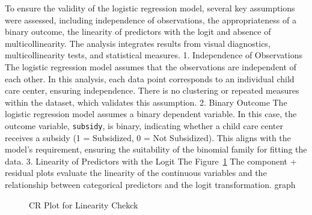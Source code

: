 \documentclass[
  letterpaper,
  DIV=11,
  numbers=noendperiod]{scrartcl}
\begin{document}
To ensure the validity of the logistic regression model, several key
assumptions were assessed, including independence of observations, the
appropriateness of a binary outcome, the linearity of predictors with
the logit and absence of multicollinearity. The analysis integrates
results from visual diagnostics, multicollinearity tests, and
statistical measures. 1. Independence of Observations The logistic
regression model assumes that the observations are independent of each
other. In this analysis, each data point corresponds to an individual
child care center, ensuring independence. There is no clustering or
repeated measures within the dataset, which validates this assumption.
2. Binary Outcome The logistic regression model assumes a binary
dependent variable. In this case, the outcome variable,
\texttt{subsidy}, is binary, indicating whether a child care center
receives a subsidy (1 = Subsidized, 0 = Not Subsidized). This aligns
with the model's requirement, ensuring the suitability of the binomial
family for fitting the data. 3. Linearity of Predictors with the Logit
The Figure~\ref{fig-cr} The component + residual plots evaluate the
linearity of the continuous variables and the relationship between
categorical predictors and the logit transformation. graph

\begin{figure}


\caption{\label{fig-cr}CR Plot for Linearity Chekck}

\end{figure}%
\end{document}
